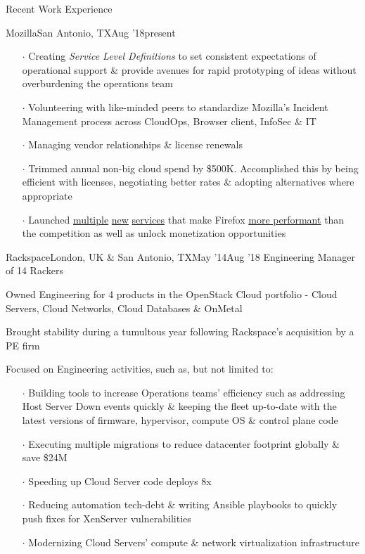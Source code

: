 \documentclass{resume} %
\begin{document}
\begin{rSection}{Recent Work Experience}
\begin{rSubsection}{Mozilla}{San Antonio, TX}{Aug '18}{present}
\begin{itemize}
    \item[$\cdot$] Creating \textit{Service Level Definitions} to set consistent expectations of operational support \& provide avenues for rapid prototyping of ideas without overburdening the operations team
    \item[$\cdot$] Volunteering with like-minded peers to standardize Mozilla's Incident Management process across CloudOps, Browser client, InfoSec \& IT
    \item[$\cdot$] Managing vendor relationships \& license renewals
    \item[$\cdot$] Trimmed annual non-big cloud spend by \$500K. Accomplished this by being efficient with licenses, negotiating better rates \& adopting alternatives where appropriate
    \item[$\cdot$] Launched \href{https://vpn.mozilla.org/}{multiple} \href{https://fpn.firefox.com/}{new} \href{https://monitor.firefox.com/}{services} that make Firefox \href{https://blog.mozilla.org/security/2020/01/21/crlite-part-3-speeding-up-secure-browsing/}{more performant} than the competition as well as unlock monetization opportunities
  \end{itemize}
  
\end{rSubsection}


\begin{rSubsection}{Rackspace}{London, UK \& San Antonio, TX}{May '14}{Aug '18}
  {Engineering Manager of 14 Rackers}
  \item Owned Engineering for 4 products in the OpenStack Cloud portfolio - Cloud Servers, Cloud Networks, Cloud Databases \& OnMetal
  \item Brought stability during a tumultous year following Rackspace's acquisition by a PE firm
  \item Focused on Engineering activities, such as, but not limited to:
    \vspace{-0.5em}
    \begin{itemize}  \itemsep0.5pt \parskip0pt
    \item[$\cdot$] Building tools to increase Operations teams' efficiency such as addressing Host Server Down events quickly \& keeping the fleet up-to-date with the latest versions of firmware, hypervisor, compute OS \& control plane code
    \item[$\cdot$] Executing multiple migrations to reduce datacenter footprint globally \& save \$24M
    \item[$\cdot$] Speeding up Cloud Server code deploys 8x
    \item[$\cdot$] Reducing automation tech-debt \& writing Ansible playbooks to quickly push fixes for XenServer vulnerabilities
    \item[$\cdot$] Modernizing Cloud Servers' compute \& network virtualization infrastructure
    \end{itemize}
\end{rSubsection}\vspace{-1em}


\end{rSection}
\end{document}
